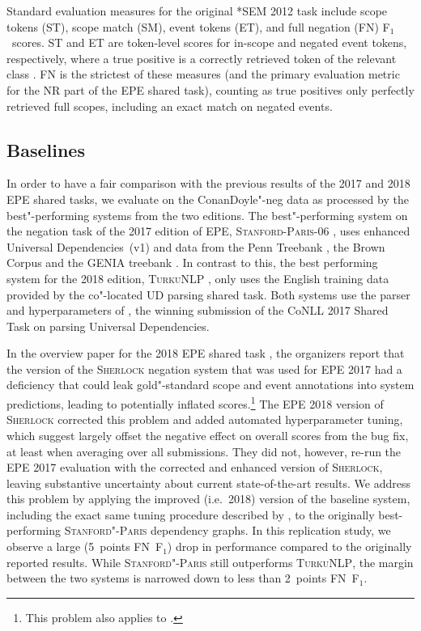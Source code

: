 \documentclass[11pt,a4paper]{article}
\theoremstyle{plain}
\def\fscore{F$_1$}
\begin{document}
Standard evaluation measures for the original *SEM 2012 task include
scope tokens (ST), scope match (SM), event tokens (ET), and full
negation (FN) \fscore\ scores. 
ST and ET are token-level scores for in-scope and negated event
tokens, respectively, where a true positive is a correctly retrieved
token of the relevant class \cite{Mor:Bla:12}. 
FN is the strictest of these measures (and the primary evaluation metric
for the NR part of the EPE shared task), counting as true positives only perfectly
retrieved full scopes, including an exact match on negated events.

\subsection{Baselines}

In order to have a fair comparison with the previous results of the
2017 and 2018 EPE shared tasks, we evaluate on the ConanDoyle"-neg data as processed by the best"-performing systems from the two editions.
The best"-performing system on the negation task of the 2017 edition of EPE, \textsc{Stanford-Paris}-06 \citep{schuster2017paris}, uses enhanced
Universal Dependencies~(v1) and data from the Penn Treebank
\citep{marcus1993building}, the Brown Corpus
\citep{francis1985frequency} and the GENIA treebank
\citep{tateisi2005syntax}.
In contrast to this, the best performing system for the 2018 edition, \textsc{TurkuNLP} \citep{kanerva2018turku},
only uses the English training data provided by the co"-located UD
parsing shared task.
Both systems use the parser and hyperparameters of
\citet{dozat2017stanford}, the winning submission of the CoNLL 2017
Shared Task on parsing Universal Dependencies.

In the overview paper for the 2018 EPE shared task
\citep{Far:Oep:Ovr:18}, the organizers report that the version of the
\textsc{Sherlock} negation system that was used for EPE 2017 had a deficiency
that could leak gold"-standard scope and event annotations into system
predictions, leading to potentially inflated scores.\footnote{This
  problem also applies to \citet{elming2013downstream}.}
The EPE 2018 version of \textsc{Sherlock} corrected this problem and
added automated hyperparameter tuning, which \citet{Far:Oep:Ovr:18}
suggest largely offset the negative effect on overall scores from
the bug fix, at least when averaging over all submissions.
They did not, however, re-run the EPE 2017 evaluation with the
corrected and enhanced version of \textsc{Sherlock}, leaving
substantive uncertainty about current state-of-the-art results.
We address this problem by applying the improved (i.e.\ 2018) version of
the baseline system, including the exact same tuning procedure
described by \citet{Far:Oep:Ovr:18}, to the originally best-performing
\textsc{Stanford"-Paris} dependency graphs.
In this replication study, we observe a large (5~points FN~\fscore) drop in
performance compared to the originally reported results.
While \textsc{Stanford"-Paris} still outperforms
\textsc{TurkuNLP}, the margin between the two systems is narrowed
down to less than 2~points FN~\fscore.
\end{document}
